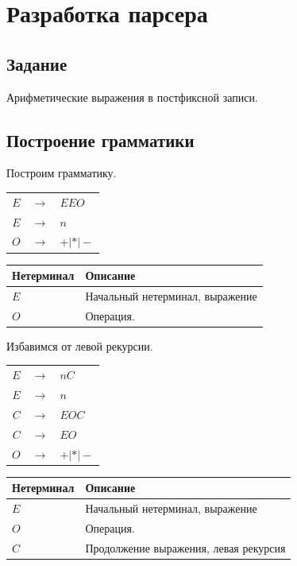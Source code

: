 \section{Разработка парсера}

\subsection{Задание}
Арифметические выражения в постфиксной записи.

\subsection{Построение грамматики}
Построим грамматику.

\begin{tabular}{ r c l }
    $E$ & $\to$ & $EEO$ \\
    $E$ & $\to$ & $n$ \\
    $O$ & $\to$ & $ + | * | - $ \\
\end{tabular}

\begin{center}
    \begin{tabular}{ | l | l | }
        \hline
        \textbf{Нетерминал} & \textbf{Описание} \\
        \hline
        $E$ & Начальный нетерминал, выражение \\
        \hline
        $O$ & Операция. \\
        \hline
    \end{tabular}
\end{center}

Избавимся от левой рекурсии.

\begin{tabular}{ r c l }
    $E$ & $\to$ & $nC$ \\
    $E$ & $\to$ & $n$ \\
    $C$ & $\to$ & $EOC$ \\
    $C$ & $\to$ & $EO$ \\
    $O$ & $\to$ & $ + | * | - $ \\
\end{tabular}

\begin{center}
    \begin{tabular}{ | l | l | }
        \hline
        \textbf{Нетерминал} & \textbf{Описание} \\
        \hline
        $E$ & Начальный нетерминал, выражение \\
        \hline
        $O$ & Операция. \\
        \hline
        $C$ & Продолжение выражения, левая рекурсия \\
        \hline
    \end{tabular}
\end{center}


